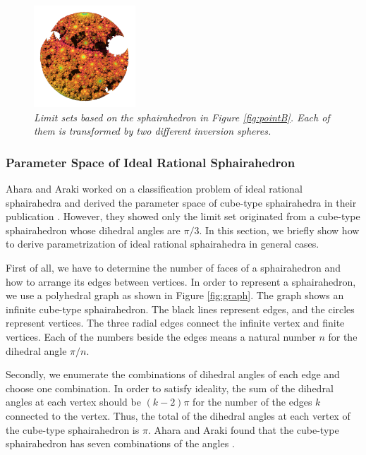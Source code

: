 \begin{figure}[htbp]
\begin{minipage}[t]{0.5\textwidth}
\begin{minipage}[t]{0.24\textwidth}
  \end{minipage}
  \hspace*{\fill}
  \begin{minipage}[t]{0.24\textwidth}
   \centering
   \includegraphics[width=1.5in, height=1.5in,
   keepaspectratio]{./img/application/sphairahedron/derivation/conj2.png}
  \end{minipage}
  \hspace*{\fill}
  \caption{\textit{Limit sets based on the sphairahedron in Figure
  \ref{fig:pointB}.
  Each of them is transformed by two different inversion spheres.}}
  \label{fig:conjugation}
 \end{minipage}
\end{figure}

\subsubsection{Parameter Space of Ideal Rational Sphairahedron}

\noindent
Ahara and Araki worked on a classification problem of ideal rational
sphairahedra and derived the parameter space of cube-type
sphairahedra in their publication
\cite{ahara2003sphairahedral}.
However, they showed only the limit set originated from a cube-type
sphairahedron whose dihedral angles are $\pi / 3$.
In this section, we briefly show how to derive parametrization of ideal
rational sphairahedra in general cases.

First of all, we have to determine the number of faces of a sphairahedron
and how to arrange its edges between vertices.
In order to represent a sphairahedron, we use a polyhedral graph as
shown in Figure \ref{fig:graph}.
The graph shows an infinite cube-type sphairahedron.
The black lines represent edges, and the circles represent vertices.
The three radial edges connect the infinite vertex and finite vertices.
Each of the numbers beside the edges means a natural number $n$ for the
dihedral angle $\pi / n$.

Secondly, we enumerate the combinations of dihedral angles of each edge and
choose one combination.
In order to satisfy ideality, the sum of the dihedral angles at each vertex
should be $(k - 2)\pi$ for the number of the edges $k$ connected to the
vertex.
Thus, the total of the dihedral angles at each vertex of the cube-type
sphairahedron is $\pi$. Ahara and Araki found that the cube-type
sphairahedron has seven combinations of the angles
\cite{ahara2003sphairahedral}.

